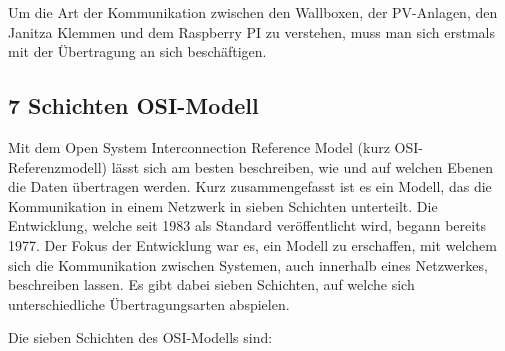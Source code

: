 \label{ModbusErklärung}
Um die Art der Kommunikation zwischen den Wallboxen, der PV-Anlagen, den Janitza Klemmen und dem Raspberry PI zu verstehen, muss man sich erstmals mit der Übertragung an sich beschäftigen.
\subsection{7 Schichten OSI-Modell} \label{OsiModell}

Mit dem Open System Interconnection Reference Model (kurz OSI-Referenzmodell) lässt sich am besten beschreiben, wie und auf welchen Ebenen die Daten übertragen werden.  Kurz zusammengefasst ist es ein Modell, das die Kommunikation in einem Netzwerk in sieben Schichten unterteilt. Die Entwicklung, welche seit 1983 als Standard veröffentlicht wird, begann bereits 1977.  Der Fokus der Entwicklung war es, ein Modell zu erschaffen, mit welchem sich die Kommunikation zwischen Systemen, auch innerhalb eines Netzwerkes, beschreiben lassen. Es gibt dabei sieben Schichten, auf welche sich unterschiedliche Übertragungsarten abspielen. 

Die sieben Schichten des OSI-Modells sind:  

